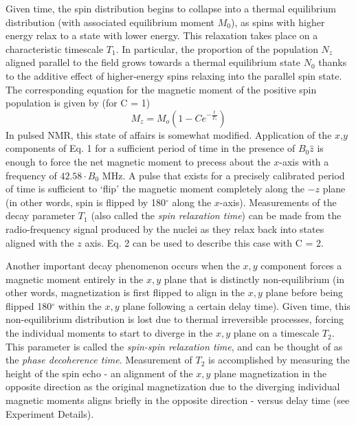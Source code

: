 \documentclass[aps,prl,nofootinbib,twocolumn,superscriptaddress,groupedaddress]{revtex4}  %
\begin{document}
Given time, the spin distribution begins to collapse into a thermal equilibrium distribution (with associated equilibrium moment $M_{0}$), as spins with higher energy relax to a state with lower energy. This relaxation takes place on a characteristic timescale $T_{1}$. In particular, the proportion of the population $N_{z}$ aligned parallel to the field grows towards a thermal equilibrium state $N_{0}$ thanks to the additive effect of higher-energy spins relaxing into the parallel spin state. The corresponding equation for the magnetic moment of the positive spin population is given by\cite{inst} (for C = 1)
\begin{equation}
M_{z} = M_{o}\left(1 - Ce^{-\frac{t}{T_{1}}}\right)
\end{equation}
\vspace{\baselineskip}
In pulsed NMR, this state of affairs is somewhat modified. Application of the $x$,$y$ components of Eq. 1 for a sufficient period of time in the presence of $B_{0}\hat{z}$ is enough to force the net magnetic moment to precess about the $x$-axis with a frequency of $42.58\cdot B_{0}$ MHz\cite{inst}. A pulse that exists for a precisely calibrated period of time is sufficient to `flip' the magnetic moment completely along the $-z$ plane (in other words, spin is flipped by 180$^{\circ}$ along the $x$-axis). Measurements of the decay parameter $T_{1}$ (also called the \textsl{spin relaxation time}) can be made from the radio-frequency signal produced by the nuclei as they relax back into states aligned with the $z$ axis. Eq. 2 can be used to describe this case\cite{inst} with C = 2.

Another important decay phenomenon occurs when the $x,y$ component forces a magnetic moment entirely in the $x,y$ plane that is distinctly non-equilibrium (in other words, magnetization is first flipped to align in the $x,y$ plane before being flipped 180$^{\circ}$ within the $x,y$ plane following a certain delay time). Given time, this non-equilibrium distribution is lost due to thermal irreversible processes, forcing the individual moments to start to diverge in the $x,y$ plane on a timescale $T_{2}$. This parameter is called the \textsl{spin-spin relaxation time}, and can be thought of as the \textsl{phase decoherence time}. Measurement of $T_{2}$ is accomplished by measuring the height of the spin echo - an alignment of the $x,y$ plane magnetization in the opposite direction as the original magnetization due to the diverging individual magnetic moments aligns briefly in the opposite direction - versus delay time (see Experiment Details). 
\end{document}
